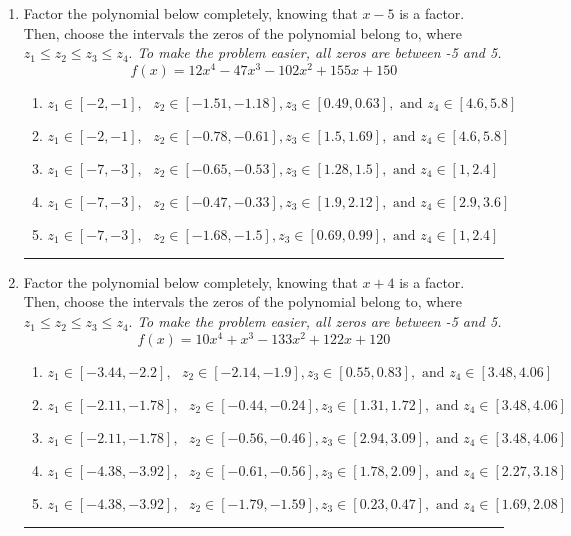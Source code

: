 \documentclass[14pt]{extbook}
\newcommand{\litem}[1]{\item#1\hspace*{-1cm}\rule{\textwidth}{0.4pt}}
\begin{document}
\begin{enumerate}
{\begin{enumerate}[label=\Alph*.]
\end{enumerate} }
\litem{
Factor the polynomial below completely, knowing that $x -5$ is a factor. Then, choose the intervals the zeros of the polynomial belong to, where $z_1 \leq z_2 \leq z_3 \leq z_4$. \textit{To make the problem easier, all zeros are between -5 and 5.}\[ f(x) = 12x^{4} -47 x^{3} -102 x^{2} +155 x + 150 \]\begin{enumerate}[label=\Alph*.]
\item \( z_1 \in [-2, -1], \text{   }  z_2 \in [-1.51, -1.18], z_3 \in [0.49, 0.63], \text{   and   } z_4 \in [4.6, 5.8] \)
\item \( z_1 \in [-2, -1], \text{   }  z_2 \in [-0.78, -0.61], z_3 \in [1.5, 1.69], \text{   and   } z_4 \in [4.6, 5.8] \)
\item \( z_1 \in [-7, -3], \text{   }  z_2 \in [-0.65, -0.53], z_3 \in [1.28, 1.5], \text{   and   } z_4 \in [1, 2.4] \)
\item \( z_1 \in [-7, -3], \text{   }  z_2 \in [-0.47, -0.33], z_3 \in [1.9, 2.12], \text{   and   } z_4 \in [2.9, 3.6] \)
\item \( z_1 \in [-7, -3], \text{   }  z_2 \in [-1.68, -1.5], z_3 \in [0.69, 0.99], \text{   and   } z_4 \in [1, 2.4] \)

\end{enumerate} }
\litem{
Factor the polynomial below completely, knowing that $x + 4$ is a factor. Then, choose the intervals the zeros of the polynomial belong to, where $z_1 \leq z_2 \leq z_3 \leq z_4$. \textit{To make the problem easier, all zeros are between -5 and 5.}\[ f(x) = 10x^{4} + x^{3} -133 x^{2} +122 x + 120 \]\begin{enumerate}[label=\Alph*.]
\item \( z_1 \in [-3.44, -2.2], \text{   }  z_2 \in [-2.14, -1.9], z_3 \in [0.55, 0.83], \text{   and   } z_4 \in [3.48, 4.06] \)
\item \( z_1 \in [-2.11, -1.78], \text{   }  z_2 \in [-0.44, -0.24], z_3 \in [1.31, 1.72], \text{   and   } z_4 \in [3.48, 4.06] \)
\item \( z_1 \in [-2.11, -1.78], \text{   }  z_2 \in [-0.56, -0.46], z_3 \in [2.94, 3.09], \text{   and   } z_4 \in [3.48, 4.06] \)
\item \( z_1 \in [-4.38, -3.92], \text{   }  z_2 \in [-0.61, -0.56], z_3 \in [1.78, 2.09], \text{   and   } z_4 \in [2.27, 3.18] \)
\item \( z_1 \in [-4.38, -3.92], \text{   }  z_2 \in [-1.79, -1.59], z_3 \in [0.23, 0.47], \text{   and   } z_4 \in [1.69, 2.08] \)


\end{enumerate}}
\end{enumerate}
\end{document}
